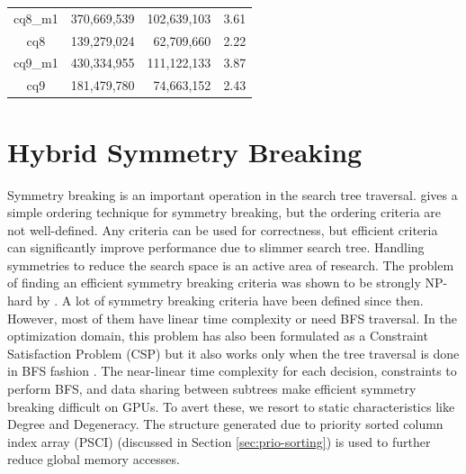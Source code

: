 \begin{table}[tbp]
\begin{tabular}{c|rrc}
        cq8\_m1                                                                & 370,669,539                                                            & 102,639,103 & 3.61 \\
        cq8                                                                    & 139,279,024                                                            & 62,709,660  & 2.22 \\
        cq9\_m1                                                                & 430,334,955                                                            & 111,122,133 & 3.87 \\
        cq9                                                                    & 181,479,780                                                            & 74,663,152  & 2.43 \\
    \end{tabular}%
    \label{tab:reuse-improvement}
\end{table}

\section{Hybrid Symmetry Breaking}\label{sec:hy-symbreak}
Symmetry breaking is an important operation in the search tree traversal.
\cite{ullman_sgm} gives a simple ordering technique for symmetry breaking, but the ordering criteria are not well-defined.
Any criteria can be used for correctness, but efficient criteria can significantly improve performance due to slimmer search tree.
Handling symmetries to reduce the search space is an active area of research.
The problem of finding an efficient symmetry breaking criteria was shown to be strongly NP-hard by \cite{crawford-sb-np-hard}.
A lot of symmetry breaking criteria have been defined since then.
However, most of them have linear time complexity or need BFS traversal.
In the optimization domain, this problem has also been formulated as a Constraint Satisfaction Problem (CSP) but it also works only when the tree traversal is done in BFS fashion \cite{sb-CSP}.
The near-linear time complexity for each decision, constraints to perform BFS, and data sharing between subtrees make efficient symmetry breaking difficult on GPUs.
To avert these, we resort to static characteristics like Degree and Degeneracy.
The structure generated due to priority sorted column index array (PSCI) (discussed in Section \ref{sec:prio-sorting}) is used to further reduce global memory accesses.

